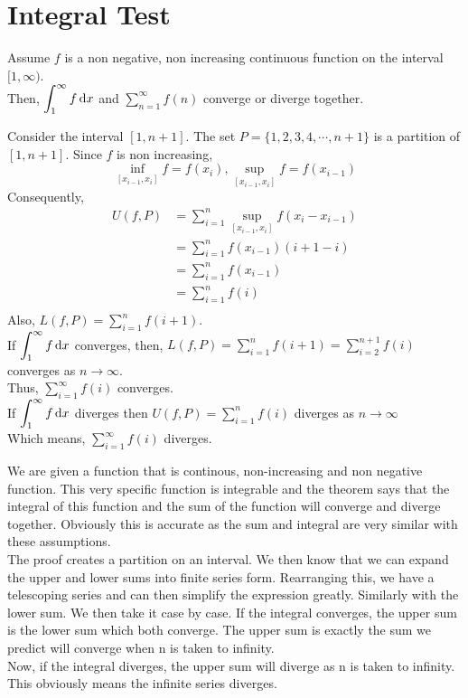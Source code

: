 \documentclass[12pt]{article}
\begin{document}
\section{Integral Test}
\begin{theo}{}
Assume \(f\) is a non negative, non increasing continuous function on the interval \([1, \infty)\).\\
Then, \(\displaystyle\int_{1}^\infty f \,\mathrm{d} x\) and \(\displaystyle\sum_{n=1}^\infty f(n)\) converge or diverge together.\\     
\end{theo}
\newpage
\begin{prf}{}
Consider the interval \([1, n+1]\). The set \(P = \{1, 2, 3, 4, \cdots , n+1\}\) is a partition of \([1, n+1]\). Since \(f\) is non increasing,
\[\displaystyle\inf_{[x_{i-1}, x_i]} f = f(x_i), \sup_{[x_{i-1},x_i]} f = f(x_{i-1})\]
Consequently,
\begin{align*}
    U(f,P) &= \displaystyle\sum_{i=1}^n \sup_{[x_{i-1}, x_i]} f(x_i - x_{i-1})\\
    &= \displaystyle\sum_{i=1}^n f(x_{i-1})(i+1-i)\\
    &= \displaystyle\sum_{i=1}^n f(x_{i-1})\\
    &= \displaystyle\sum_{i=1}^n f(i)\\
\end{align*}
Also, \(L(f,P) = \displaystyle\sum_{i=1}^n f(i+1)\).\\
If \(\displaystyle\int_1^\infty f \,\mathrm{d} x\) converges, then, \(L(f, P) = \displaystyle\sum_{i=1}^n f(i+1) = \displaystyle\sum_{i=2}^{n+1}f(i)\) converges as \(n\to\infty\).\\
Thus, \(\displaystyle\sum_{i=1}^\infty f(i)\) converges.\\
If \(\displaystyle\int_1^\infty f \,\mathrm{d} x\) diverges then \(U(f,P) = \displaystyle\sum_{i=1}^n f(i)\) diverges as \(n\to\infty\)\\
Which means, \(\displaystyle\sum_{i=1}^\infty f(i)\) diverges.  
\end{prf}
\begin{explanation}{}
    We are given a function that is continous, non-increasing and non negative function. This very specific function is integrable and the theorem says that the integral of this function and the sum of the function will converge and diverge together. Obviously this is accurate as the sum and integral are very similar with these assumptions.\\
The proof creates a partition on an interval. We then know that we can expand the upper and lower sums into finite series form.  Rearranging this, we have a telescoping series and can then simplify the expression greatly. Similarly with the lower sum. We then take it case by case. If the integral converges, the upper sum is the lower sum which both converge. The upper sum is exactly the sum we predict will converge when n is taken to infinity.\\
Now, if the integral diverges, the upper sum will diverge as n is taken to infinity. This obviously means the infinite series diverges.\\
\end{explanation}
\end{document}
